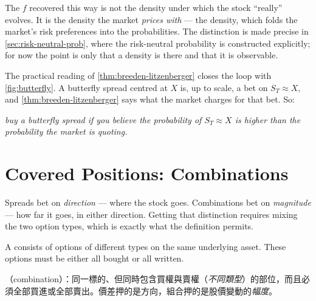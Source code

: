 \begin{note}
	The $f$ recovered this way is not the density under which the stock ``really'' evolves.
	It is the density the market \emph{prices with} --- the  density, which folds the market's risk preferences into the probabilities.
	The distinction is made precise in \autoref{sec:risk-neutral-prob}, where the risk-neutral probability is constructed explicitly; for now the point is only that a density is there and that it is observable.
\end{note}

The practical reading of \autoref{thm:breeden-litzenberger} closes the loop with \autoref{fig:butterfly}.
A butterfly spread centred at $X$ is, up to scale, a bet on $S_{T}\approx X$, and \autoref{thm:breeden-litzenberger} says what the market charges for that bet.
So:
\suppend

\begin{center}
	\emph{buy a butterfly spread if you believe the probability of $S_{T}\approx X$
		is higher than the probability the market is quoting.}
\end{center}

\section{Covered Positions: Combinations}
\label{sec:combinations}


\suppstart
Spreads bet on \emph{direction} --- where the stock goes.
Combinations bet on \emph{magnitude} --- how far it goes, in either direction.
Getting that distinction requires mixing the two option types, which is exactly what the definition permits.

\begin{definition}
	A  consists of options of different types on the same underlying asset.
	These options must be either all bought or all written.
\end{definition}

\begin{remark}
	（combination）：同一標的、但同時包含買權與賣權（\emph{不同類型}）的部位，而且必須全部買進或全部賣出。價差押的是方向，組合押的是股價變動的\emph{幅度}。
\end{remark}
\suppend

